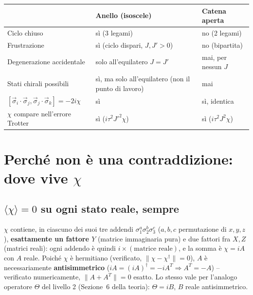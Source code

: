 \documentclass[11pt,a4paper]{article}
\begin{document}
\begin{center}
\renewcommand{\arraystretch}{1.35}
\begin{tabular}{@{}p{4.6cm}p{5.1cm}p{5.1cm}@{}}
\toprule
& \textbf{Anello (isoscele)} & \textbf{Catena aperta} \\
\midrule
Ciclo chiuso & sì (3 legami) & no (2 legami) \\
Frustrazione & sì (ciclo dispari, $J,J'{>}0$) & no (bipartita) \\
Degenerazione accidentale & solo all'equilatero $J{=}J'$ & mai, per nessun $J$ \\
Stati chirali possibili & sì, ma solo all'equilatero (non il punto di lavoro) & mai \\
$[\vec\sigma_i\!\cdot\!\vec\sigma_j,\vec\sigma_j\!\cdot\!\vec\sigma_k]=-2i\chi$ & sì & sì, identica \\
$\chi$ compare nell'errore Trotter & sì ($i\tau^2J'^2\chi$) & sì ($i\tau^2J^2\chi$) \\
\bottomrule
\end{tabular}
\end{center}

\section{Perché non è una contraddizione: dove vive $\chi$}

\subsection{$\langle\chi\rangle=0$ su ogni stato reale, sempre}

$\chi$ contiene, in ciascuno dei suoi tre addendi $\sigma_1^a\sigma_2^b\sigma_3^c$
($a,b,c$ permutazione di $x,y,z$), \textbf{esattamente un fattore $Y$} (matrice
immaginaria pura) e due fattori fra $X,Z$ (matrici reali): ogni addendo è
quindi $i\times(\text{matrice reale})$, e la somma è $\chi=iA$ con $A$
reale. Poiché $\chi$ è hermitiano (verificato,
$\|\chi-\chi^\dagger\|=0$), $A$ è necessariamente \textbf{antisimmetrico}
($iA=(iA)^\dagger=-iA^T\Rightarrow A^T=-A$) -- verificato numericamente,
$\|A+A^T\|=0$ esatto. Lo stesso vale per l'analogo operatore $\Theta$ del
livello 2 (Sezione~6 della teoria): $\Theta=iB$, $B$ reale antisimmetrico.
\end{document}
